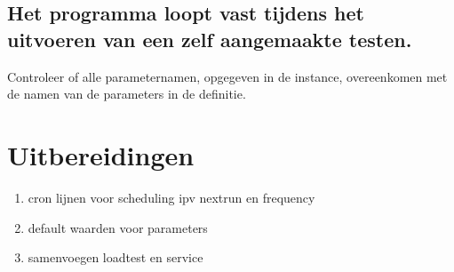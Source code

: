 \subsection{Het programma loopt vast tijdens het uitvoeren van een zelf aangemaakte testen.}
\npar 
Controleer of alle parameternamen, opgegeven in de instance, overeenkomen met de namen van de parameters in de definitie.

\section{Uitbereidingen}
\begin{enumerate}
\item cron lijnen voor scheduling ipv nextrun en frequency
\item default waarden voor parameters
\item samenvoegen loadtest en service
\end{enumerate}